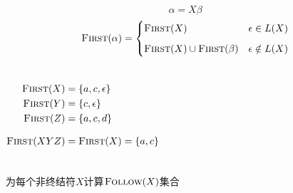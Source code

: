\begin{frame}{}
  \begin{center}

    

  \end{center}
\end{frame}

\begin{frame}{}
  \begin{center}

    \[
      \alpha = X \beta
    \]
    \[
      \textsc{First}(\alpha) =
      \begin{cases}
        \textsc{First}(X) & \epsilon \in L(X) \\[6pt]
        \textsc{First}(X) \cup \textsc{First}(\beta) & \epsilon \notin L(X)
      \end{cases}
    \]
  \end{center}
\end{frame}

\begin{frame}{}
  \begin{columns}
      
      \pause
      \begin{align*}
        \textsc{First}(X) &= \{a, c, \epsilon\} \\
        \textsc{First}(Y) &= \{c, \epsilon\} \\
        \textsc{First}(Z) &= \{a, c, d\} \\[8pt]
        \textsc{First}(XYZ) &= \textsc{First}(X) = \{a, c\}
      \end{align*}
  \end{columns}
\end{frame}

\begin{frame}{}
  \begin{center}
    {\large 为每个非终结符$X$计算$\textsc{Follow}(X)$集合}

    

  \end{center}
\end{frame}


